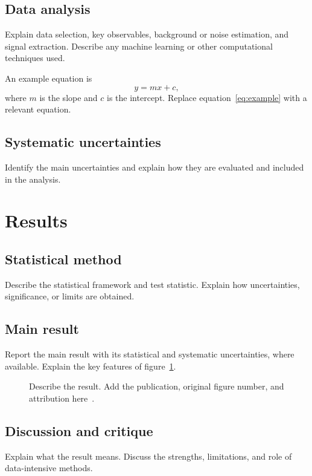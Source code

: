 \documentclass{iopconfser}
\begin{document}
\subsection{Data analysis}
Explain data selection, key observables, background or noise
estimation, and signal extraction. Describe any machine learning
or other computational techniques used.

An example equation is
\begin{equation}
    y = mx + c,
    \label{eq:example}
\end{equation}
where \(m\) is the slope and \(c\) is the intercept.
Replace equation~\eqref{eq:example} with a relevant equation.

\subsection{Systematic uncertainties}
Identify the main uncertainties and explain how they are
evaluated and included in the analysis.

\section{Results}

\subsection{Statistical method}
Describe the statistical framework and test statistic.
Explain how uncertainties, significance, or limits are obtained.

\subsection{Main result}
Report the main result with its statistical and systematic
uncertainties, where available. Explain the key features of
figure~\ref{fig:result}.

\begin{figure}[htbp]
    \centering
    \caption{Describe the result. Add the publication,
    original figure number, and attribution here~\cite{paper}.}
    \label{fig:result}
\end{figure}

\subsection{Discussion and critique}
Explain what the result means. Discuss the strengths,
limitations, and role of data-intensive methods.
\end{document}
